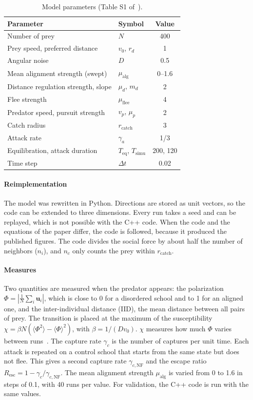 \documentclass[9pt,twoside]{pnas-new}
\begin{document}
\begin{table}[b]
\centering
\caption{Model parameters (Table S1 of~\cite{klamser2021}).}
\label{tab:params}
\begin{tabular}{llc}
\toprule
Parameter & Symbol & Value \\
\midrule
Number of prey & $N$ & 400 \\
Prey speed, preferred distance & $v_0$, $r_d$ & 1 \\
Angular noise & $D$ & 0.5 \\
Mean alignment strength (swept) & $\mu_{\mathrm{alg}}$ & 0--1.6 \\
Distance regulation strength, slope & $\mu_d$, $m_d$ & 2 \\
Flee strength & $\mu_{\mathrm{flee}}$ & 4 \\
Predator speed, pursuit strength & $v_p$, $\mu_p$ & 2 \\
Catch radius & $r_{\mathrm{catch}}$ & 3 \\
Attack rate & $\gamma_a$ & 1/3 \\
Equilibration, attack duration & $T_{\mathrm{eq}}$, $T_{\mathrm{simu}}$ & 200, 120 \\
Time step & $\Delta t$ & 0.02 \\
\bottomrule
\end{tabular}
\end{table}

\paragraph*{Reimplementation}
The model was rewritten in Python. Directions are stored as unit vectors, so the code can be
extended to three dimensions. Every run takes a seed and can be replayed, which is not possible with
the C++ code. When the code and the equations of the paper differ, the code is followed, because it
produced the published figures. The code divides the social force by about half the number of neighbors
($n_i$), and $n_c$ only counts the prey within $r_{\mathrm{catch}}$.

\paragraph*{Measures}
Two quantities are measured when the predator appears: the polarization
$\Phi = |\frac{1}{N}\sum_i \mathbf{u}_i|$, which is close to 0 for a disordered school and to 1 for
an aligned one, and the inter-individual distance (IID), the mean distance between all pairs of prey. The transition is placed at the maximum
of the susceptibility $\chi = \beta N(\langle\Phi^2\rangle - \langle\Phi\rangle^2)$, with
$\beta = 1/(D v_0)$. $\chi$ measures how much $\Phi$ varies between runs~\cite{klamser2021}. The capture
rate $\gamma_c$ is the number of captures per unit time. Each attack is repeated on a control school
that starts from the same state but does not flee. This gives a second capture rate
$\gamma_{c,\mathrm{NF}}$ and the escape ratio $R_{\mathrm{esc}} = 1 - \gamma_c/\gamma_{c,\mathrm{NF}}$.
The mean alignment strength $\mu_{\mathrm{alg}}$ is varied from 0 to 1.6 in steps of 0.1, with 40
runs per value. For validation, the C++ code is run with the same values.
\end{document}
